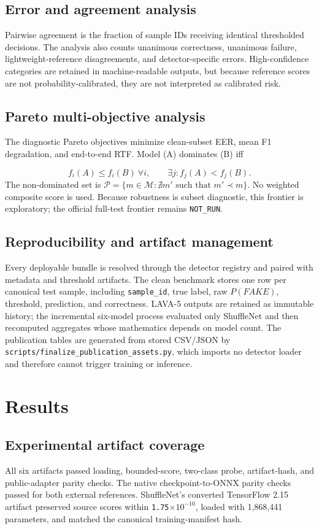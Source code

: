 \documentclass[10pt,journal,onecolumn]{IEEEtran}
\begin{document}
\subsection{Error and agreement analysis}
Pairwise agreement is the fraction of sample IDs receiving identical thresholded decisions. The analysis also counts unanimous correctness, unanimous failure, lightweight-reference disagreements, and detector-specific errors. High-confidence categories are retained in machine-readable outputs, but because reference scores are not probability-calibrated, they are not interpreted as calibrated risk.

\subsection{Pareto multi-objective analysis}
The diagnostic Pareto objectives minimize clean-subset EER, mean F1 degradation, and end-to-end RTF. Model (A) dominates (B) iff

\begin{equation}
f_i(A)\le f_i(B)\ \forall i,\qquad \exists j:f_j(A)<f_j(B).
\end{equation}
The non-dominated set is $\mathcal{P}=\{m\in\mathcal{M}:\nexists m'\text{ such that }m'\prec m\}$. No weighted composite score is used. Because robustness is subset diagnostic, this frontier is exploratory; the official full-test frontier remains \texttt{NOT\_RUN}.

\subsection{Reproducibility and artifact management}
Every deployable bundle is resolved through the detector registry and paired with metadata and threshold artifacts. The clean benchmark stores one row per canonical test sample, including \texttt{sample\_id}, true label, raw $P(FAKE)$, threshold, prediction, and correctness. LAVA-5 outputs are retained as immutable history; the incremental six-model process evaluated only ShuffleNet and then recomputed aggregates whose mathematics depends on model count. The publication tables are generated from stored CSV/JSON by \texttt{scripts/finalize\_publication\_assets.py}, which imports no detector loader and therefore cannot trigger training or inference.

\section{Results}
\subsection{Experimental artifact coverage}
All six artifacts passed loading, bounded-score, two-class probe, artifact-hash, and public-adapter parity checks. The native checkpoint-to-ONNX parity checks passed for both external references. ShuffleNet's converted TensorFlow 2.15 artifact preserved source scores within \texttt{1.75$\times 10^{-10}$}, loaded with 1,868,441 parameters, and matched the canonical training-manifest hash.
\end{document}
